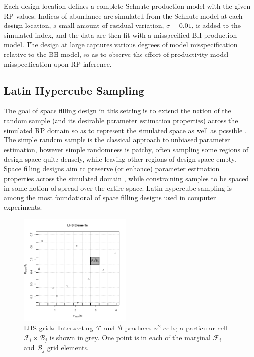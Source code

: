 %
Each design location defines a complete Schnute production model with the given
RP values. Indices of abundance are simulated from the Schnute model at each design
location, a small amount of residual variation, $\sigma=0.01$, is added to the
simulated index, and the data are then fit with a misspecified BH production model.
The design at large captures various degrees of model misspecification relative
to the BH model, so as to observe the effect of productivity model misspecification
upon RP inference.

%
\clearpage
\subsection{Latin Hypercube Sampling \label{lhs}}

%
The goal of space filling design in this setting is to extend the notion of the
random sample (and its desirable parameter estimation properties) across the
simulated RP domain so as to represent the simulated space as well as possible \cite{gramacy_surrogates_2020}.
The simple random sample is the classical approach to unbiased parameter
estimation, however simple randomness is patchy, often sampling some regions
of design space quite densely, while leaving other regions of design space empty.
Space filling designs aim to preserve (or enhance) parameter estimation properties 
across the simulated domain \cite{devon_lin_latin_2015, stein_large_1987},
while constraining samples to be spaced in some notion of spread over the entire space.
Latin hypercube sampling \cite[LHS]{mckay_comparison_2000} is among the most
foundational of space filling designs used in computer experiments.

%
\begin{figure}
\vspace{-1cm}
\includegraphics[width=0.49\textwidth]{../gpBias/designGrid.png}
\vspace{-0.5cm}
\caption{ LHS grids. Intersecting $\mathcal{F}$ and $\mathcal{B}$ produces $n^2$
cells; a particular cell $\mathcal{F}_i\times\mathcal{B}_j$ is shown in grey.
One point is in each of the marginal $\mathcal{F}_i$ and $\mathcal{B}_j$ grid
elements.
}
\end{figure}

